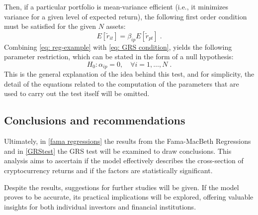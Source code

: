Then, if a particular portfolio is mean-variance efficient (i.e., it minimizes variance for a given level of expected return), the following first order condition must be satisfied for the given $N$ assets:
\begin{equation}
	\label{eq: GRS condition}
	E[\tilde{r}_{it}] = \beta_{ip}E[\tilde{r}_{pt}]\;.
\end{equation}
Combining \eqref{eq: reg-example} with \eqref{eq: GRS condition}, yields the following parameter restriction, which can be stated in the form of a null hypothesis:
\begin{equation*}
	H_{0}: \alpha_{ip}=0,\quad \forall i=1,\dots,N\;.
\end{equation*}
This is the general explanation of the idea behind this test, and for simplicity, the detail of the equations related to the computation of the parameters that are used to carry out the test itself will be omitted.

\subsection{Conclusions and recommendations}
Ultimately, in \ref{fama regressions} the results from the Fama-MacBeth Regressions and in \ref{GRStest} the GRS test will be examined to draw conclusions. This analysis aims to ascertain if the model effectively describes the cross-section of cryptocurrency returns and if the factors are statistically significant.

Despite the results, suggestions for further studies will be given. If the model proves to be accurate, its practical implications will be explored, offering valuable insights for both individual investors and financial institutions.







